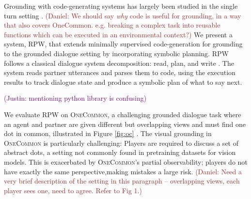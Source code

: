 \documentclass[11pt]{article}
\newcommand{\system}{RPW}
\newcommand{\justin}[1]{{{\textcolor{purple}{(Justin: #1)}}}}
\newcommand{\wenting}[1]{{{\textcolor{orange}{(Wenting: #1)}}}}
\newcommand{\daniel}[1]{{{\textcolor{brown}{(Daniel: #1)}}}}
\begin{document}
Grounding with code-generating systems has largely been studied in the single turn setting \citep{vipergpt,codeaspolicies2022}.
\daniel{We should say \emph{why} code is useful for grounding, in a way that also covers OneCommon. e.g. breaking a complex task into reusable functions which can be executed in an environmental context?}
We present a system, \system{}, that extends minimally supervised code-generation for grounding
to the grounded dialogue setting by incorporating symbolic planning.
\system{} follows a classical dialogue system decomposition:
read, plan, and write \citep{young2013pomdpsurvey}.
The system reads partner utterances and parses them to code,
using the execution results to track dialogue state and produce a symbolic plan of what to say next.

\justin{mentioning python library is confusing}

We evaluate \system{} on \textsc{OneCommon}, a challenging grounded dialogue task where an agent and partner are given different but overlapping views and must find one dot in common, illustrated in Figure \ref{fig:oc} \citep{onecommon}.
The visual grounding in \textsc{OneCommon} is particularly challenging:
Players are required to discuss a set of abstract dots, a setting not commonly found in
pretraining datasets for vision models.
This is exacerbated by \textsc{OneCommon}'s partial observability;
players do not have exactly the same perspective,making mistakes a large risk.
\daniel{Need a very brief description of the setting in this paragraph -- overlapping views, each player sees one, need to agree. Refer to Fig 1.}
\end{document}
